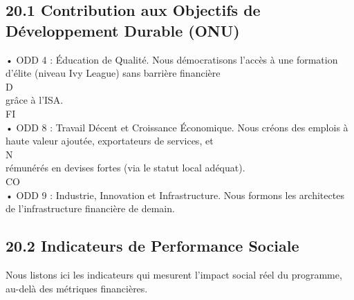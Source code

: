 \subsection{20.1 Contribution aux Objectifs de Développement Durable (ONU)}
• ODD 4 : Éducation de Qualité. Nous démocratisons l’accès à une formation d’élite (niveau Ivy League) sans barrière financière\\
\vspace{0.5em}
\vspace{0.5em}
\vspace{0.5em}
\vspace{0.5em}
D\\
grâce à l’ISA.\\
\vspace{0.5em}
\vspace{0.5em}
\vspace{0.5em}
\vspace{0.5em}
FI\\
• ODD 8 : Travail Décent et Croissance Économique. Nous créons des emplois à haute valeur ajoutée, exportateurs de services, et\\
N\\
rémunérés en devises fortes (via le statut local adéquat).\\
CO\\
• ODD 9 : Industrie, Innovation et Infrastructure. Nous formons les architectes de l’infrastructure financière de demain.\\
\vspace{0.5em}
\vspace{0.5em}
\subsection{20.2 Indicateurs de Performance Sociale}
Nous listons ici les indicateurs qui mesurent l’impact social réel du programme, au-delà des métriques financières.\\
\vspace{0.5em}
\vspace{0.5em}
